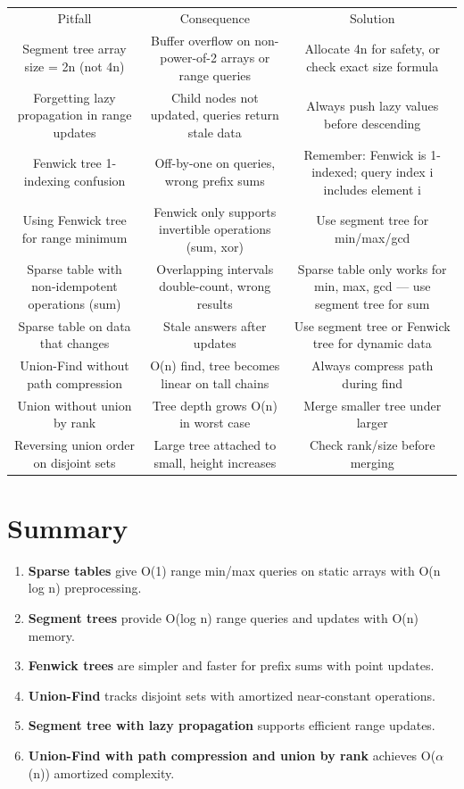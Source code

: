 \begin{center}
\begin{tabular}{ccc}
\toprule
Pitfall & Consequence & Solution \\
Segment tree array size = 2n (not 4n) & Buffer overflow on non-power-of-2 arrays or range queries & Allocate 4n for safety, or check exact size formula \\
Forgetting lazy propagation in range updates & Child nodes not updated, queries return stale data & Always push lazy values before descending \\
Fenwick tree 1-indexing confusion & Off-by-one on queries, wrong prefix sums & Remember: Fenwick is 1-indexed; query index i includes element i \\
Using Fenwick tree for range minimum & Fenwick only supports invertible operations (sum, xor) & Use segment tree for min/max/gcd \\
Sparse table with non-idempotent operations (sum) & Overlapping intervals double-count, wrong results & Sparse table only works for min, max, gcd — use segment tree for sum \\
Sparse table on data that changes & Stale answers after updates & Use segment tree or Fenwick tree for dynamic data \\
Union-Find without path compression & O(n) find, tree becomes linear on tall chains & Always compress path during find \\
Union without union by rank & Tree depth grows O(n) in worst case & Merge smaller tree under larger \\
Reversing union order on disjoint sets & Large tree attached to small, height increases & Check rank/size before merging \\

\bottomrule
\end{tabular}
\end{center}
\section{Summary}

\begin{enumerate}
\item \textbf{Sparse tables} give O(1) range min/max queries on static arrays with O(n log n) preprocessing.
\item \textbf{Segment trees} provide O(log n) range queries and updates with O(n) memory.
\item \textbf{Fenwick trees} are simpler and faster for prefix sums with point updates.
\item \textbf{Union-Find} tracks disjoint sets with amortized near-constant operations.
\item \textbf{Segment tree with lazy propagation} supports efficient range updates.
\item \textbf{Union-Find with path compression and union by rank} achieves O($\alpha $(n)) amortized complexity.
\end{enumerate}

